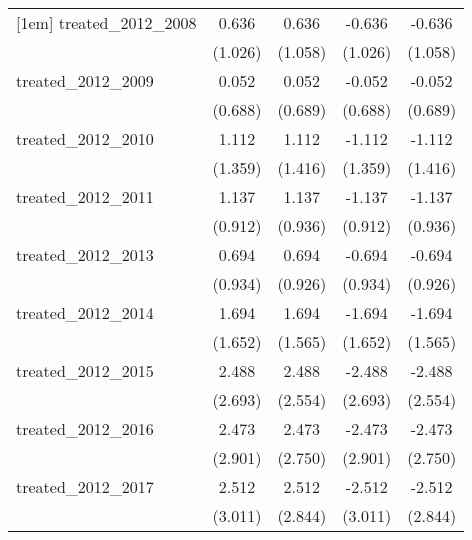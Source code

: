 {\begin{tabular}{l*{4}{c}}
[1em]
treated\_2012\_2008&       0.636         &       0.636         &      -0.636         &      -0.636         \\
            &     (1.026)         &     (1.058)         &     (1.026)         &     (1.058)         \\
[1em]
treated\_2012\_2009&       0.052         &       0.052         &      -0.052         &      -0.052         \\
            &     (0.688)         &     (0.689)         &     (0.688)         &     (0.689)         \\
[1em]
treated\_2012\_2010&       1.112         &       1.112         &      -1.112         &      -1.112         \\
            &     (1.359)         &     (1.416)         &     (1.359)         &     (1.416)         \\
[1em]
treated\_2012\_2011&       1.137         &       1.137         &      -1.137         &      -1.137         \\
            &     (0.912)         &     (0.936)         &     (0.912)         &     (0.936)         \\
[1em]
treated\_2012\_2013&       0.694         &       0.694         &      -0.694         &      -0.694         \\
            &     (0.934)         &     (0.926)         &     (0.934)         &     (0.926)         \\
[1em]
treated\_2012\_2014&       1.694         &       1.694         &      -1.694         &      -1.694         \\
            &     (1.652)         &     (1.565)         &     (1.652)         &     (1.565)         \\
[1em]
treated\_2012\_2015&       2.488         &       2.488         &      -2.488         &      -2.488         \\
            &     (2.693)         &     (2.554)         &     (2.693)         &     (2.554)         \\
[1em]
treated\_2012\_2016&       2.473         &       2.473         &      -2.473         &      -2.473         \\
            &     (2.901)         &     (2.750)         &     (2.901)         &     (2.750)         \\
[1em]
treated\_2012\_2017&       2.512         &       2.512         &      -2.512         &      -2.512         \\
            &     (3.011)         &     (2.844)         &     (3.011)         &     (2.844)         \\

\end{tabular}}
